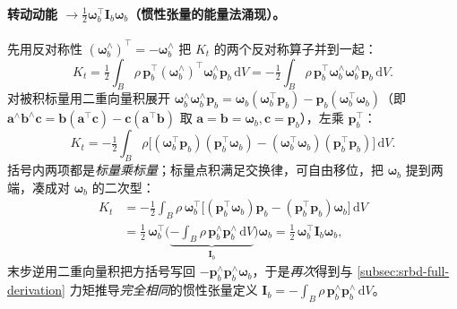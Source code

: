 \paragraph{转动动能 $\to\tfrac12\boldsymbol{\omega}_b^\top\mathbf{I}_b\boldsymbol{\omega}_b$（惯性张量的能量法涌现）。}
先用反对称性 $(\boldsymbol{\omega}_b^\wedge)^\top=-\boldsymbol{\omega}_b^\wedge$ 把 $K_t$ 的两个反对称算子并到一起\cite{unitree2023quadruped}：
\begin{equation}
  K_t=\tfrac12\int_B\rho\,\boldsymbol{p}_b^\top(\boldsymbol{\omega}_b^\wedge)^\top\boldsymbol{\omega}_b^\wedge\boldsymbol{p}_b\,\mathrm{d}V
  =-\tfrac12\int_B\rho\,\boldsymbol{p}_b^\top\boldsymbol{\omega}_b^\wedge\boldsymbol{\omega}_b^\wedge\boldsymbol{p}_b\,\mathrm{d}V.
  \label{eq:Kt-1}
\end{equation}
对被积标量用二重向量积展开 $\boldsymbol{\omega}_b^\wedge\boldsymbol{\omega}_b^\wedge\boldsymbol{p}_b=\boldsymbol{\omega}_b(\boldsymbol{\omega}_b^\top\boldsymbol{p}_b)-\boldsymbol{p}_b(\boldsymbol{\omega}_b^\top\boldsymbol{\omega}_b)$（即 $\boldsymbol{a}^\wedge\boldsymbol{b}^\wedge\boldsymbol{c}=\boldsymbol{b}(\boldsymbol{a}^\top\boldsymbol{c})-\boldsymbol{c}(\boldsymbol{a}^\top\boldsymbol{b})$ 取 $\boldsymbol{a}=\boldsymbol{b}=\boldsymbol{\omega}_b,\boldsymbol{c}=\boldsymbol{p}_b$），左乘 $\boldsymbol{p}_b^\top$\cite{unitree2023quadruped}：
\begin{equation}
  K_t=-\tfrac12\int_B\rho\big[(\boldsymbol{\omega}_b^\top\boldsymbol{p}_b)(\boldsymbol{p}_b^\top\boldsymbol{\omega}_b)-(\boldsymbol{\omega}_b^\top\boldsymbol{\omega}_b)(\boldsymbol{p}_b^\top\boldsymbol{p}_b)\big]\,\mathrm{d}V.
  \label{eq:Kt-2}
\end{equation}
括号内两项都是\emph{标量乘标量}；标量点积满足交换律，可自由移位，把 $\boldsymbol{\omega}_b$ 提到两端，凑成对 $\boldsymbol{\omega}_b$ 的二次型\cite{unitree2023quadruped}：
\begin{equation}
\begin{aligned}
  K_t&=-\tfrac12\int_B\rho\,\boldsymbol{\omega}_b^\top\big[(\boldsymbol{p}_b^\top\boldsymbol{\omega}_b)\boldsymbol{p}_b-(\boldsymbol{p}_b^\top\boldsymbol{p}_b)\boldsymbol{\omega}_b\big]\,\mathrm{d}V\\
  &=\tfrac12\,\boldsymbol{\omega}_b^\top\Big(\underbrace{-\!\int_B\rho\,\boldsymbol{p}_b^\wedge\boldsymbol{p}_b^\wedge\,\mathrm{d}V}_{\mathbf{I}_b}\Big)\boldsymbol{\omega}_b
  =\tfrac12\,\boldsymbol{\omega}_b^\top\mathbf{I}_b\boldsymbol{\omega}_b,
\end{aligned}
\label{eq:Kt-3}
\end{equation}
末步逆用二重向量积把方括号写回 $-\boldsymbol{p}_b^\wedge\boldsymbol{p}_b^\wedge\boldsymbol{\omega}_b$，于是\emph{再次}得到与 \cref{subsec:srbd-full-derivation} 力矩推导\emph{完全相同}的惯性张量定义 $\mathbf{I}_b=-\int_B\rho\,\boldsymbol{p}_b^\wedge\boldsymbol{p}_b^\wedge\,\mathrm{d}V$。

